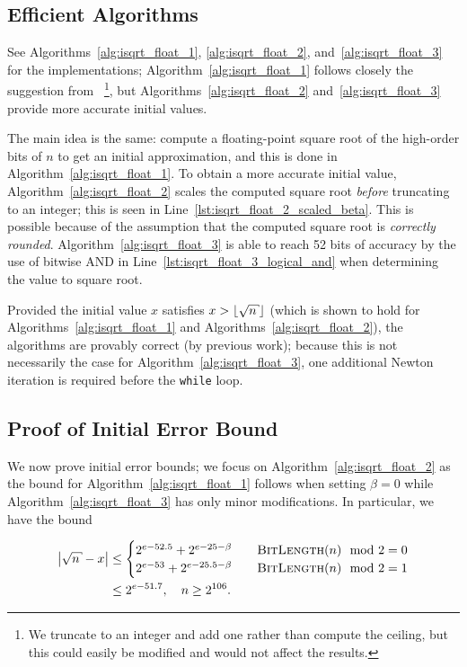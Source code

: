 \subsection{Efficient Algorithms}

See Algorithms~\ref{alg:isqrt_float_1}, \ref{alg:isqrt_float_2},
and~\ref{alg:isqrt_float_3} for the implementations;
Algorithm~\ref{alg:isqrt_float_1} follows closely the suggestion
from~\cite[Chapter 1.7, Remarks]{cohen1993}%
\footnote{We truncate to an integer and add one
rather than compute the ceiling,
but this could easily be modified and would not affect the results.},
but Algorithms~\ref{alg:isqrt_float_2} and~\ref{alg:isqrt_float_3}
provide more accurate initial values.





The main idea is the same:
compute a floating-point square root of the high-order bits of $n$
to get an initial approximation,
and this is done in Algorithm~\ref{alg:isqrt_float_1}.
To obtain a more accurate initial value,
Algorithm~\ref{alg:isqrt_float_2} scales the computed square root
\emph{before} truncating to an integer;
this is seen in Line~\ref{lst:isqrt_float_2_scaled_beta}.
This is possible because of the assumption that the computed square root
is \emph{correctly rounded}.
Algorithm~\ref{alg:isqrt_float_3} is able to reach 52 bits of accuracy
by the use of bitwise AND in Line~\ref{lst:isqrt_float_3_logical_and}
when determining the value to square root.

Provided the initial value $x$ satisfies $x > \floor{\sqrt{n}}$
(which is shown to hold for
Algorithms~\ref{alg:isqrt_float_1} and Algorithms~\ref{alg:isqrt_float_2}),
the algorithms are provably correct (by previous work);
because this is not necessarily the case for Algorithm~\ref{alg:isqrt_float_3},
one additional Newton iteration is required before the \texttt{while} loop.


\subsection{Proof of Initial Error Bound}

We now prove initial error bounds;
we focus on Algorithm~\ref{alg:isqrt_float_2} as the bound
for Algorithm~\ref{alg:isqrt_float_1} follows when setting $\beta=0$
while Algorithm~\ref{alg:isqrt_float_3} has only minor modifications.
In particular, we have the bound

\begin{align}
    \abs{\sqrt{n} - x} &\le \begin{cases}
        2^{e-52.5} + 2^{e-25-\beta} &\quad \textsc{BitLength}(n) \mod 2 = 0   \\
        2^{e-53}   + 2^{e-25.5-\beta} &\quad \textsc{BitLength}(n) \mod 2 = 1 \\
    \end{cases} \nonumber\\
    &\le 2^{e-51.7}, \quad n\ge 2^{106}.
\end{align}

